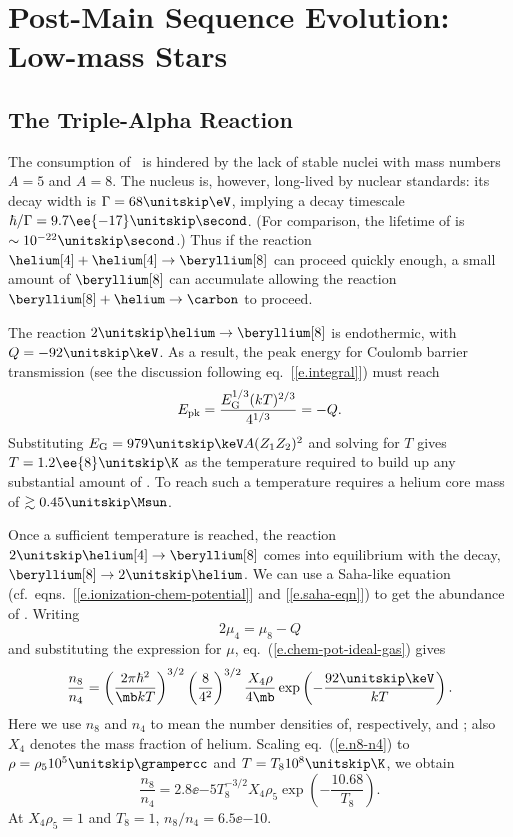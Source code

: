 \chapter[Low-Mass Post-Main Sequence]{Post-Main Sequence Evolution: Low-mass Stars}

\section{The Triple-Alpha Reaction}\label{s.triple-alpha}

The consumption of \helium\ is hindered by the lack of stable nuclei with mass numbers $A=5$ and $A=8$.  
The nucleus \beryllium[8] is, however, long-lived by nuclear standards: its decay width is $\Gamma = 68\nsp\eV$, implying a decay timescale $\hbar/\Gamma = 9.7\ee{-17}\nsp\second$.  (For comparison, the lifetime of \lithium[5] is $\sim 10^{-22}\nsp\second$.)  Thus if the reaction $\helium[4]+\helium[4]\to\beryllium[8]$ can proceed quickly enough, a small amount of $\beryllium[8]$ can accumulate allowing the reaction $\beryllium[8]+\helium\to\carbon$ to proceed.

The reaction $2\nsp\helium\to\beryllium[8]$ is endothermic, with $Q = -92\nsp\keV$.  As a result, the peak energy for Coulomb barrier transmission (see the discussion following eq.~[\ref{e.integral}]) must reach
\[ E_{\mathrm{pk}} = \frac{E_{\mathrm{G}}^{1/3}(kT)^{2/3}}{4^{1/3}} = -Q. \]
Substituting $\EG = 979\nsp\keV A (Z_{1}Z_{2})^{2}$ and solving for $T$ gives $T = 1.2\ee{8}\nsp\K$ as the temperature required to build up any substantial amount of \beryllium[8].  To reach such a temperature requires a helium core mass of $\gtrsim 0.45\nsp\Msun$.

Once a sufficient temperature is reached, the reaction $2\nsp\helium[4]\to\beryllium[8]$ comes into equilibrium with the decay, $\beryllium[8]\to2\nsp\helium$.  We can use a Saha-like equation (cf.\ eqns.~[\ref{e.ionization-chem-potential}] and [\ref{e.saha-eqn}]) to get the abundance of \beryllium[8].  Writing
\[ 2\mu_{4} = \mu_{8} - Q \]
and substituting the expression for $\mu$, eq.~(\ref{e.chem-pot-ideal-gas}) gives
\begin{equation}\label{e.n8-n4}
\frac{n_{8}}{n_{4}} = \left(\frac{2\pi\hbar^{2}}{\mb kT}\right)^{3/2}\left(\frac{8}{4^{2}}\right)^{3/2}\frac{X_{4}\rho}{4\mb}\exp\left(-\frac{92\nsp\keV}{kT}\right).
\end{equation}
Here we use $n_{8}$ and $n_{4}$ to mean the number densities of, respectively, \beryllium[8] and \helium; also $X_{4}$ denotes the mass fraction of helium.
Scaling eq.~(\ref{e.n8-n4}) to $\rho = \rho_{5} 10^{5}\nsp\grampercc$ and $T = T_{8}10^{8}\nsp\K$, we obtain
\begin{equation}\label{e.n8-to-n4}
 \frac{n_{8}}{n_{4}} = 2.8\ee{-5} T_{8}^{-3/2}X_{4}\rho_{5}\exp\left(-\frac{10.68}{T_{8}}\right).
\end{equation}
At $X_{4}\rho_{5}=1$ and $T_{8} = 1$, $n_{8}/n_{4} = 6.5\ee{-10}$.  


